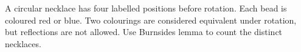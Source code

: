 A circular necklace has four labelled positions before rotation. Each bead is coloured red or blue. Two colourings are considered equivalent under rotation, but reflections are not allowed. Use Burnside\textquotesingle s lemma to count the distinct necklaces.
